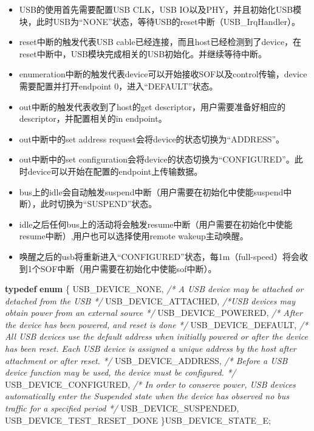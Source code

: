 \documentclass[
  12pt,
]{book}
\newenvironment{Shaded}{\begin{snugshade}}{\end{snugshade}}
\newcommand{\CommentTok}[1]{\textcolor[rgb]{0.56,0.35,0.01}{\textit{#1}}}
\newcommand{\KeywordTok}[1]{\textcolor[rgb]{0.13,0.29,0.53}{\textbf{#1}}}
\newcommand{\NormalTok}[1]{#1}
\providecommand{\tightlist}{%
  \setlength{\itemsep}{0pt}\setlength{\parskip}{0pt}}
\begin{document}
\begin{itemize}
\tightlist
\item
  USB的使用首先需要配置USB CLK，USB IO以及PHY，并且初始化USB模块，此时USB为``NONE''状态，等待USB的reset中断（USB\_IrqHandler）。
\item
  reset中断的触发代表USB cable已经连接，而且host已经检测到了device，在reset中断中，USB模块完成相关的USB初始化。并继续等待中断。
\item
  enumeration中断的触发代表device可以开始接收SOF以及control传输，device需要配置并打开endpoint 0，进入``DEFAULT''状态。
\item
  out中断的触发代表收到了host的get descriptor，用户需要准备好相应的descriptor，并配置相关的in endpoint。
\item
  out中断中的set address request会将device的状态切换为``ADDRESS''。
\item
  out中断中的set configuration会将device的状态切换为``CONFIGURED''。此时device可以开始在配置的endpoint上传输数据。
\item
  bus上的idle会自动触发suspend中断（用户需要在初始化中使能suspend中断），此时切换为``SUSPEND''状态。
\item
  idle之后任何bus上的活动将会触发resume中断（用户需要在初始化中使能resume中断）,用户也可以选择使用remote wakeup主动唤醒。
\item
  唤醒之后的usb将重新进入``CONFIGURED''状态，每1m（full-speed）将会收到1个SOF中断（用户需要在初始化中使能sof中断）。
\end{itemize}

\begin{Shaded}
\begin{Highlighting}[]
\KeywordTok{typedef} \KeywordTok{enum}
\NormalTok{\{}
\NormalTok{  USB_DEVICE_NONE,}
  \CommentTok{/* A USB device may be attached or detached from the USB */}
\NormalTok{  USB_DEVICE_ATTACHED,}
  \CommentTok{/*USB devices may obtain power from an external source  */}
\NormalTok{  USB_DEVICE_POWERED,}
  \CommentTok{/*  After the device has been powered, and reset is done */}
\NormalTok{  USB_DEVICE_DEFAULT,}
  \CommentTok{/*  All USB devices use the default address when initially powered or after the device has been reset. Each}
\CommentTok{      USB device is assigned a unique address by the host after attachment or after reset. */}
\NormalTok{  USB_DEVICE_ADDRESS,}
  \CommentTok{/* Before a USB device function may be used, the device must be configured. */}
\NormalTok{  USB_DEVICE_CONFIGURED,}
  \CommentTok{/* In order to conserve power, USB devices automatically enter the Suspended state when the device has}
\CommentTok{     observed no bus traffic for a specified period */}
\NormalTok{  USB_DEVICE_SUSPENDED,}
\NormalTok{  USB_DEVICE_TEST_RESET_DONE}
\NormalTok{\}USB_DEVICE_STATE_E;}
\end{Highlighting}
\end{Shaded}
\end{document}
